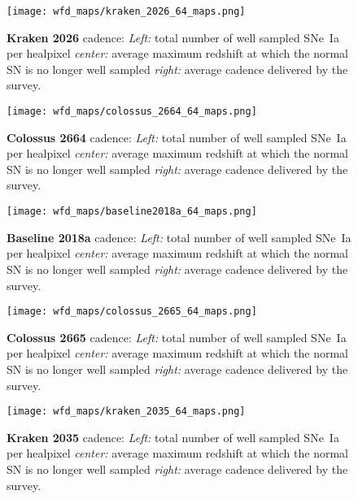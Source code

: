 \begin{figure}[h!]
  \begin{center}
    \texttt{[image: wfd\_maps/kraken\_2026\_64\_maps.png]}
    \caption{{\bf Kraken 2026} cadence: {\em Left:} total number of well
      sampled SNe~Ia per healpixel {\em center:} average maximum
      redshift at which the normal SN is no longer well sampled {\em
        right:} average cadence delivered by the survey.}
  \end{center}
  \label{fig:kraken_2026}
\end{figure}

\begin{figure}[h!]
  \begin{center}
    \texttt{[image: wfd\_maps/colossus\_2664\_64\_maps.png]}
    \caption{{\bf Colossus 2664} cadence: {\em Left:} total number of well
      sampled SNe~Ia per healpixel {\em center:} average maximum
      redshift at which the normal SN is no longer well sampled {\em
        right:} average cadence delivered by the survey.}
    \label{fig:colossus_2664}
  \end{center}
\end{figure}

\begin{figure}[h!]
  \begin{center}
    \texttt{[image: wfd\_maps/baseline2018a\_64\_maps.png]}
    \caption{{\bf Baseline 2018a} cadence: {\em Left:} total number of well
      sampled SNe~Ia per healpixel {\em center:} average maximum
      redshift at which the normal SN is no longer well sampled {\em
        right:} average cadence delivered by the survey.}
  \end{center}
  \label{fig:baseline2018}
\end{figure}

\begin{figure}[h!]
  \begin{center}
    \texttt{[image: wfd\_maps/colossus\_2665\_64\_maps.png]}
    \caption{{\bf Colossus 2665} cadence: {\em Left:} total number of well
      sampled SNe~Ia per healpixel {\em center:} average maximum
      redshift at which the normal SN is no longer well sampled {\em
        right:} average cadence delivered by the survey.}
  \end{center}
  \label{fig:colossus_2665}
\end{figure}

\begin{figure}[h!]
  \begin{center}
    \texttt{[image: wfd\_maps/kraken\_2035\_64\_maps.png]}
    \caption{{\bf Kraken 2035} cadence: {\em Left:} total number of well
      sampled SNe~Ia per healpixel {\em center:} average maximum
      redshift at which the normal SN is no longer well sampled {\em
        right:} average cadence delivered by the survey.}
  \end{center}
  \label{fig:kraken_2035}
\end{figure}

